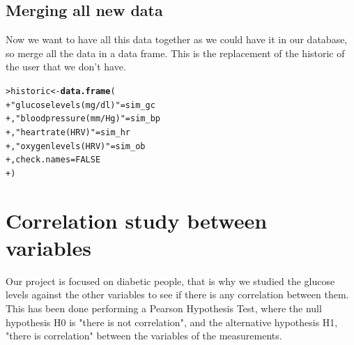 \documentclass{article}\usepackage[]{graphicx}\usepackage[]{xcolor}
\makeatletter
\newcommand{\hlnum}[1]{\textcolor[rgb]{0.686,0.059,0.569}{#1}}%
\newcommand{\hlstr}[1]{\textcolor[rgb]{0.192,0.494,0.8}{#1}}%
\newcommand{\hlstd}[1]{\textcolor[rgb]{0.345,0.345,0.345}{#1}}%
\newcommand{\hlkwb}[1]{\textcolor[rgb]{0.69,0.353,0.396}{#1}}%
\newcommand{\hlkwc}[1]{\textcolor[rgb]{0.333,0.667,0.333}{#1}}%
\newcommand{\hlkwd}[1]{\textcolor[rgb]{0.737,0.353,0.396}{\textbf{#1}}}%
\newenvironment{kframe}{%
 \def\at@end@of@kframe{}%
 \ifinner\ifhmode%
  \def\at@end@of@kframe{\end{minipage}}%
  \begin{minipage}{\columnwidth}%
 \fi\fi%
 \def\FrameCommand##1{\hskip\@totalleftmargin \hskip-\fboxsep
 \colorbox{shadecolor}{##1}\hskip-\fboxsep
     \hskip-\linewidth \hskip-\@totalleftmargin \hskip\columnwidth}%
 \MakeFramed {\advance\hsize-\width
   \@totalleftmargin\z@ \linewidth\hsize
   \@setminipage}}%
 {\par\unskip\endMakeFramed%
 \at@end@of@kframe}
\newenvironment{knitrout}{}{} %
\makeatother
\begin{document}
\subsection*{Merging all new data}
Now we want to have all this data together as we could have it in our database, so merge all the data in a data frame. This is the replacement of the historic of the user that we don't have.
\begin{knitrout}\footnotesize
{}\color{fgcolor}\begin{kframe}
\begin{alltt}
\hlstd{> }\hlstd{historic} \hlkwb{<-} \hlkwd{data.frame}\hlstd{(}
\hlstd{+ }  \hlstr{"glucose levels (mg/dl)"} \hlstd{= sim_gc}
\hlstd{+ }  \hlstd{,}\hlstr{"blood pressure (mm/Hg)"} \hlstd{= sim_bp}
\hlstd{+ }  \hlstd{,}\hlstr{"heart rate (HRV)"} \hlstd{= sim_hr}
\hlstd{+ }  \hlstd{,}\hlstr{"oxygen levels (HRV)"} \hlstd{= sim_ob}
\hlstd{+ }  \hlstd{,}\hlkwc{check.names}\hlstd{=}\hlnum{FALSE}
\hlstd{+ }\hlstd{)}
\end{alltt}
\end{kframe}
\end{knitrout}
\section{Correlation study between variables}
Our project is focused on diabetic people, that is why we studied the glucose levels against the other variables to see if there is any correlation between them. This has been done performing a Pearson Hypothesis Test, where the null hypothesis H0 is "there is not correlation", and the alternative hypothesis H1, "there is correlation" between the variables of the measurements.
\end{document}
